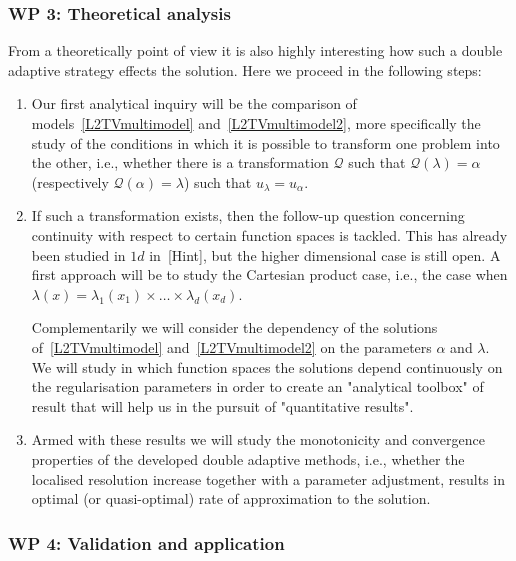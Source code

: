 \documentclass[enabledeprecatedfontcommands,cleardoublepage=empty,headsepline,twoside,11pt,DIV=15,BCOR=12mm,final]{scrartcl}
\begin{document}
 

 
%
% 


 \subsubsection*{WP 3: Theoretical analysis}

From a theoretically point of view it is also highly interesting how such a double adaptive strategy effects the solution. Here we proceed in the following steps:
 
 \begin{enumerate}
 \item Our first analytical inquiry will be the comparison of models~\eqref{L2TVmultimodel} and~\eqref{L2TVmultimodel2}, more specifically the study of the conditions in which it is possible to transform one problem into the other, i.e., whether there is a transformation $\mathcal{Q}$ such that $\mathcal{Q}(\lambda)=\alpha$ (respectively $\mathcal{Q}(\alpha)=\lambda$) such that $u_\lambda = u_\alpha$. 
 
 \item If such a transformation exists, then the follow-up question concerning continuity with respect to certain function spaces is tackled. This has already been studied in $1d$ in~{[Hint]}, 
but the higher dimensional case is still open. A first approach will be to study the Cartesian product case, i.e., the case when $\lambda(x)=\lambda_1(x_1)\times \dots \times \lambda_d(x_d)$.

Complementarily we will consider the dependency of the solutions of~\eqref{L2TVmultimodel} and~\eqref{L2TVmultimodel2} on the parameters  $\alpha$ and $\lambda$. We will study in which function spaces the solutions depend continuously on the regularisation parameters in order to create an "analytical toolbox" of result that will help us in the pursuit of "quantitative results". 
 
 \item Armed with these results we will study the monotonicity and convergence properties of the developed double adaptive methods, i.e., whether the localised resolution increase together with a parameter adjustment, results in optimal (or quasi-optimal) rate of approximation to the solution. 
 \end{enumerate} 
 
\subsubsection*{WP 4: Validation and application} 
 
\end{document}
